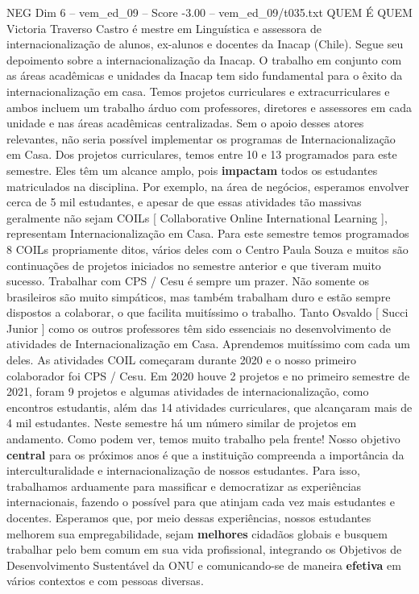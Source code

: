 \begin{textsample}{NEG Dim 6 – vem\_ed\_09 – Score -3.00 – vem\_ed\_09/t035.txt}  \label{ex:f6_neg_027}
QUEM É QUEM Victoria Traverso Castro é mestre em Linguística e assessora de internacionalização de alunos, ex-alunos e docentes da Inacap (Chile).
Segue seu depoimento sobre a internacionalização da Inacap.
O trabalho em conjunto com as áreas acadêmicas e unidades da Inacap tem sido fundamental para o êxito da internacionalização em casa.
Temos projetos curriculares e extracurriculares e ambos incluem um trabalho árduo com professores, diretores e assessores em cada unidade e nas áreas acadêmicas centralizadas.
Sem o apoio desses atores relevantes, não seria possível implementar os programas de Internacionalização em Casa.
Dos projetos curriculares, temos entre 10 e 13 programados para este semestre.
Eles têm um alcance amplo, pois \textbf{impactam} todos os estudantes matriculados na disciplina.
Por exemplo, na área de negócios, esperamos envolver cerca de 5 mil estudantes, e apesar de que essas atividades tão massivas geralmente não sejam COILs [ Collaborative Online International Learning ], representam Internacionalização em Casa.
Para este semestre temos programados 8 COILs propriamente ditos, vários deles com o Centro Paula Souza e muitos são continuações de projetos iniciados no semestre anterior e que tiveram muito sucesso.
Trabalhar com CPS / Cesu é sempre um prazer.
Não somente os brasileiros são muito simpáticos, mas também trabalham duro e estão sempre dispostos a colaborar, o que facilita muitíssimo o trabalho.
Tanto Osvaldo [ Succi Junior ] como os outros professores têm sido essenciais no desenvolvimento de atividades de Internacionalização em Casa.
Aprendemos muitíssimo com cada um deles.
As atividades COIL começaram durante 2020 e o nosso primeiro colaborador foi CPS / Cesu.
Em 2020 houve 2 projetos e no primeiro semestre de 2021, foram 9 projetos e algumas atividades de internacionalização, como encontros estudantis, além das 14 atividades curriculares, que alcançaram mais de 4 mil estudantes.
Neste semestre há um número similar de projetos em andamento.
Como podem ver, temos muito trabalho pela frente!
Nosso objetivo \textbf{central} para os próximos anos é que a instituição compreenda a importância da interculturalidade e internacionalização de nossos estudantes.
Para isso, trabalhamos arduamente para massificar e democratizar as experiências internacionais, fazendo o possível para que atinjam cada vez mais estudantes e docentes.
Esperamos que, por meio dessas experiências, nossos estudantes melhorem sua empregabilidade, sejam \textbf{melhores} cidadãos globais e busquem trabalhar pelo bem comum em sua vida profissional, integrando os Objetivos de Desenvolvimento Sustentável da ONU e comunicando-se de maneira \textbf{efetiva} em vários contextos e com pessoas diversas.

\end{textsample}
